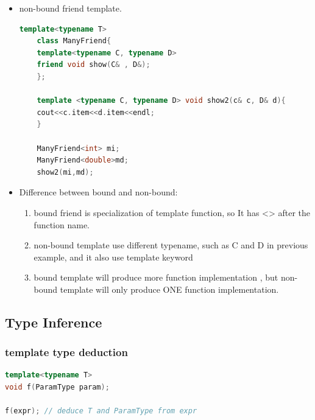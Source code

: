 \documentclass[a4paper,12pt,twoside]{book}
\begin{document}
\begin{itemize}
	\item non-bound friend template.
	\begin{lstlisting}[frame=single, language=c++]
	template<typename T>
	class ManyFriend{
	template<typename C, typename D>
	friend void show(C& , D&);
	};
	
	template <typename C, typename D> void show2(c& c, D& d){
	cout<<c.item<<d.item<<endl;
	}
	
	ManyFriend<int> mi;
	ManyFriend<double>md;
	show2(mi,md);
	\end{lstlisting}
	
	\item Difference between bound and non-bound:
	
	\begin{enumerate}
		\item bound friend is specialization of template function, so It has <> after the function name.
		
		\item non-bound template use different typename, such as C and D in previous example, and it also use template keyword
		
		\item bound template will produce more function implementation , but non-bound template will only produce ONE function implementation.
	\end{enumerate}

\end{itemize}
\subsection{Type Inference}


\subsubsection{template type deduction}

\begin{lstlisting}[frame=single, language=c++]
template<typename T>
void f(ParamType param);

f(expr); // deduce T and ParamType from expr
\end{lstlisting}
\end{document}
